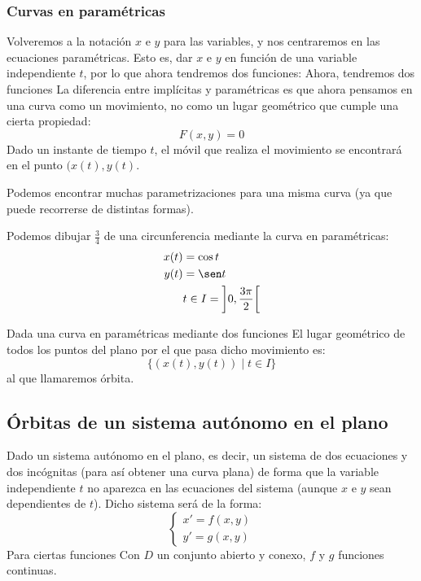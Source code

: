 \subsubsection{Curvas en paramétricas}
Volveremos a la notación $x$ e $y$ para las variables, y nos centraremos en las ecuaciones paramétricas. Esto es, dar $x$ e $y$ en función de una variable independiente $t$, por lo que ahora tendremos dos funciones:
Ahora, tendremos dos funciones
La diferencia entre implícitas y paramétricas es que ahora pensamos en una curva como un movimiento, no como un lugar geométrico que cumple una cierta propiedad: 
\begin{equation*}
    F(x,y) = 0
\end{equation*}
Dado un instante de tiempo $t$, el móvil que realiza el movimiento se encontrará en el punto $(x(t), y(t)$.

Podemos encontrar muchas parametrizaciones para una misma curva (ya que puede recorrerse de distintas formas).
\begin{ejemplo}
    Podemos dibujar $\frac{3}{4}$ de una circunferencia mediante la curva en paramétricas:
    \begin{align*}
        x(t) &= \cos t \\
        y(t) &= \sen t \\
             & t \in I=\left]0, \dfrac{3\pi}{2}\right[
    \end{align*}
\end{ejemplo}

\begin{definicion}[Órbita]
Dada una curva en paramétricas mediante dos funciones
El lugar geométrico de todos los puntos del plano por el que pasa dicho movimiento es:
\begin{equation*}
    \{(x(t),y(t)) \mid t\in I\}
\end{equation*}
al que llamaremos órbita.
\end{definicion}

\subsection{Órbitas de un sistema autónomo en el plano}
Dado un sistema autónomo en el plano, es decir, un sistema de dos ecuaciones y dos incógnitas (para así obtener una curva plana) de forma que la variable independiente $t$ no aparezca en las ecuaciones del sistema (aunque $x$ e $y$ sean dependientes de $t$). Dicho sistema será de la forma:
\begin{equation*}
    \left\{\begin{array}{c}
            x' = f(x,y) \\
            y' = g(x,y)
    \end{array}\right.
\end{equation*}
Para ciertas funciones
Con $D$ un conjunto abierto y conexo, $f$ y $g$ funciones continuas.\\

